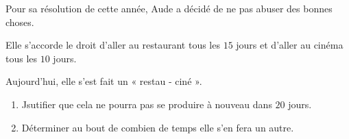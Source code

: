 \begin{exercice*}
    Pour sa résolution de cette année, Aude a décidé de ne pas abuser des bonnes choses.

    Elle s'accorde le droit d'aller au restaurant tous les $15$ jours et d'aller au cinéma tous les $10$ jours.

    Aujourd'hui, elle s'est fait un « restau - ciné ».

    \begin{enumerate}
        \item Jsutifier que cela ne pourra pas se produire à nouveau dans $20$ jours.
        \item Déterminer au bout de combien de temps elle s'en fera un autre.
    \end{enumerate}

\end{exercice*}
